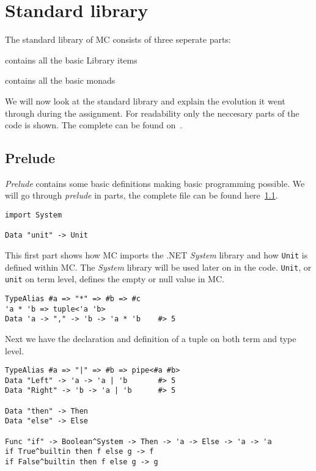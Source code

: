 \chapter{Standard library}\label{chap:standardlibrary}
The standard library of MC consists of three seperate parts:

\begin{description}[align=right,labelwidth=2cm]
   \item [StandardLibrary] contains all the basic Library items
   \item [BasicMonads] contains all the basic monads
\end{description}

We will now look at the standard library and explain the evolution it went through during the assignment.
For readability only the neccesary parts of the code is shown.
The complete can be found on~\cite{}.

\section{Prelude}
\emph{Prelude} contains some basic definitions making basic programming possible.
We will go through \emph{prelude} in parts, the complete file can be found here~\ref{}.

\begin{lstlisting}
import System

Data "unit" -> Unit
\end{lstlisting}

This first part shows how MC imports the .NET \emph{System} library and how \verb|Unit| is defined within MC.
The \emph{System} library will be used later on in the code.
\verb|Unit|, or \verb|unit| on term level, defines the empty or null value in MC.

\begin{lstlisting}
TypeAlias #a => "*" => #b => #c
'a * 'b => tuple<'a 'b>
Data 'a -> "," -> 'b -> 'a * 'b    #> 5
\end{lstlisting}
Next we have the declaration and definition of a tuple on both term and type level.

\begin{lstlisting}
TypeAlias #a => "|" => #b => pipe<#a #b>
Data "Left" -> 'a -> 'a | 'b       #> 5
Data "Right" -> 'b -> 'a | 'b      #> 5

Data "then" -> Then
Data "else" -> Else

Func "if" -> Boolean^System -> Then -> 'a -> Else -> 'a -> 'a
if True^builtin then f else g -> f
if False^builtin then f else g -> g
\end{lstlisting}

